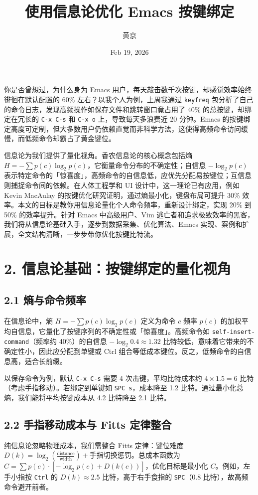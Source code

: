 \title{使用信息论优化 Emacs 按键绑定}
\author{黄京}
\date{Feb 19, 2026}
\maketitle
你是否曾想过，为什么身为 Emacs 用户，每天敲击数千次按键，却感觉效率始终徘徊在默认配置的 60\%{} 左右？以我个人为例，上周我通过 \texttt{keyfreq} 包分析了自己的命令日志，发现高频操作如保存文件和跳转窗口竟占用了 40\%{} 的总按键，却绑定在冗长的 \texttt{C-x C-s} 和 \texttt{C-x o} 上，导致每天多浪费近 20 分钟。Emacs 的按键绑定高度可定制，但大多数用户仍依赖直觉而非科学方法，这使得高频命令访问缓慢，而低频命令却霸占了黄金键位。\par
信息论为我们提供了量化视角。香农信息论的核心概念包括熵 $H = -\sum p(c) \log _2 p(c)$，它衡量命令分布的不确定性；自信息 $-\log _2 p(c)$ 表示特定命令的「惊喜度」，高频命令的自信息低，应优先分配易按键位；互信息则捕捉命令间的依赖。在人体工程学和 UI 设计中，这一理论已有应用，例如 Kevin MacAulay 的按键优化研究证明，通过熵最小化，键盘布局可提升 30\%{} 效率。本文的目标是教你用信息论量化个人命令频率，重新设计绑定，实现 20\%{} 到 50\%{} 的效率提升。针对 Emacs 中高级用户、Vim 逃亡者和追求极致效率的黑客，我们将从信息论基础入手，逐步到数据采集、优化算法、Emacs 实现、案例和扩展，全文结构清晰，一步步带你优化按键比特流。\par
\chapter{2. 信息论基础：按键绑定的量化视角}
\section{2.1 熵与命令频率}
在信息论中，熵 $H = -\sum p(c) \log _2 p(c)$ 定义为命令 $c$ 频率 $p(c)$ 的加权平均自信息，它量化了按键序列的不确定性或「惊喜度」。高频命令如 \texttt{self-insert-command}（频率约 40\%{}）的自信息 $-\log _2 0.4 \approx 1.32$ 比特较低，意味着它带来的不确定性小，因此应分配到单键或 Ctrl 组合等低成本键位。反之，低频命令的自信息高，适合长前缀。\par
以保存命令为例，默认 \texttt{C-x C-s} 需要 4 次击键，平均比特成本约 $4 \times 1.5 = 6$ 比特（考虑手指移动）。若绑定到单键如 \texttt{SPC s}，成本降至 1.2 比特。通过最小化总熵，我们能将平均按键成本从 4.2 比特降至 2.1 比特。\par
\section{2.2 手指移动成本与 Fitts 定律整合}
纯信息论忽略物理成本，我们需整合 Fitts 定律：键位难度 $D(k) = \log _2 \left( \frac{\text{distance}}{\text{width}} \right) + \text{手指切换惩罚}$。总成本函数为 $C = \sum p(c) \cdot [-\log _2 p(c) + D(k(c))]$，优化目标是最小化 $C$。例如，左手小指按 \texttt{Ctrl} 的 $D(k) \approx 2.5$ 比特，高于右手食指的 \texttt{SPC}（0.8 比特），故高频命令避开前者。\par
